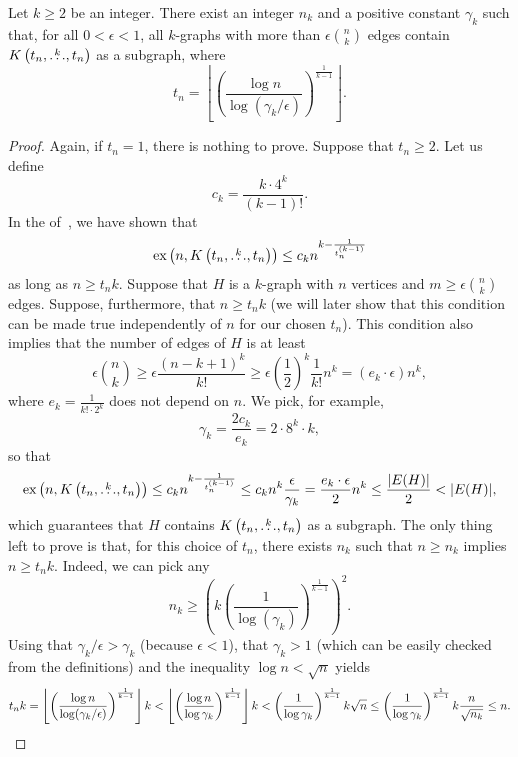 \begin{theorem} \label{thm:erdos64-constant-density}
    Let $k \geq 2$ be an integer.
    There exist an integer $n_k$ and a positive constant $\gamma_k$
    such that, for all
    $0 < \epsilon < 1$,
    all $k$-graphs with more than $\epsilon \binom{n}{k}$ edges
    contain $K\left(t_n, \overset{k}{\dots}, t_n\right)$ as a subgraph, where
    \[
        t_n = \left\lfloor \left( \frac{\log n}{\log(\gamma_k/\epsilon)} \right)^{\frac{1}{k-1}} \right\rfloor.
    \]
    \begin{proof}
        Again, if $t_n=1$, there is nothing to prove.
        Suppose that $t_n \geq 2$.
        Let us define
        \[
            c_k = \frac{k \cdot 4^k}{(k-1)!}.
        \]
        In the  of~, we have shown that
        \[
            \text{ex} \left( n, K\left(t_n, \overset{k}{\dots}, t_n\right) \right) \leq c_k n^{k - \frac{1}{t_n^{(k-1)}}}
        \]
        as long as $n \geq t_n k$.
        Suppose that $H$ is a $k$-graph with $n$ vertices and $m \geq \epsilon \binom{n}{k}$ edges.
        Suppose, furthermore, that $n \geq t_n k$
        (we will later show that this condition can be made true independently of $n$ for our chosen $t_n$).
        This condition also implies that the number of edges of $H$ is at least
        \[
            \epsilon \binom{n}{k} \geq \epsilon \frac{(n - k + 1)^k}{k!} \geq \epsilon \left( \frac{1}{2} \right)^k \frac{1}{k!} n^{k} = (e_k  \cdot \epsilon) n^{k},
        \]
        where $e_k = \frac{1}{k! \cdot 2^k}$ does not depend on $n$.
        We pick, for example,
        \[
             \gamma_k = \frac{2c_k}{e_k} = 2 \cdot 8^k \cdot k,
        \]
        so that
        \[
            \text{ex} \left( n, K\left(t_n, \overset{k}{\dots}, t_n\right) \right) \leq c_k n^{k - \frac{1}{t_n^{(k-1)}}} \leq c_k n^k  \frac{\epsilon}{\gamma_k}
            = \frac{e_k \cdot \epsilon}{2} n^{k} \leq  \frac{|E(H)|}{2} < |E(H)|,
        \]
        which guarantees that $H$ contains $K\left(t_n, \overset{k}{\dots}, t_n\right)$ as a subgraph.
        The only thing left to prove is that, for this choice of $t_n$, there exists $n_k$
        such that $n \geq n_k$ implies $n \geq t_n k$.
        Indeed, we can pick any
        \[
            n_k \geq \left( k \left(\frac{1}{\log(\gamma_k)} \right)^{\frac{1}{k-1}}\right)^2.
        \]
        Using that $\gamma_k / \epsilon > \gamma_k$ (because $\epsilon < 1$),
        that $\gamma_k > 1$ (which can be easily checked from the definitions)
        and the inequality $\log n < \sqrt{n}$ yields
        \[
            t_n k
            = \left\lfloor \left( \frac{\log n}{\log(\gamma_k / \epsilon)} \right)^{\frac{1}{k-1}} \right\rfloor k
            < \left\lfloor \left( \frac{\log n}{\log\gamma_k} \right)^{\frac{1}{k-1}} \right\rfloor k
            <   \left( \frac{1}{\log \gamma_k} \right)^{\frac{1}{k-1}} k \sqrt{n}
            \leq \left( \frac{1}{\log \gamma_k} \right)^{\frac{1}{k-1}} k \frac{n}{\sqrt{n_k}}
            \leq n. \qedhere
        \]
    \end{proof}
\end{theorem}


